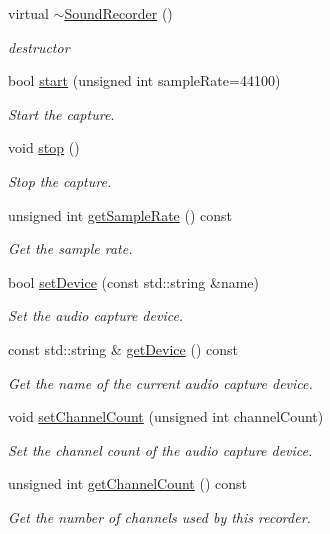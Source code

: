 \begin{DoxyCompactItemize}
\item 
\mbox{\label{classsf_1_1_sound_recorder_acc599e61aaa47edaae88cf43f0a43549}} 
virtual \hyperlink{classsf_1_1_sound_recorder_acc599e61aaa47edaae88cf43f0a43549}{$\sim$\+Sound\+Recorder} ()
\begin{DoxyCompactList}\small\item\em destructor \end{DoxyCompactList}\item 
bool \hyperlink{classsf_1_1_sound_recorder_a715f0fd2f228c83d79aaedca562ae51f}{start} (unsigned int sample\+Rate=44100)
\begin{DoxyCompactList}\small\item\em Start the capture. \end{DoxyCompactList}\item 
void \hyperlink{classsf_1_1_sound_recorder_a8d9c8346aa9aa409cfed4a1101159c4c}{stop} ()
\begin{DoxyCompactList}\small\item\em Stop the capture. \end{DoxyCompactList}\item 
unsigned int \hyperlink{classsf_1_1_sound_recorder_aed292c297a3e0d627db4eb5c18f58c44}{get\+Sample\+Rate} () const
\begin{DoxyCompactList}\small\item\em Get the sample rate. \end{DoxyCompactList}\item 
bool \hyperlink{classsf_1_1_sound_recorder_a8eb3e473292c16e874322815836d3cd3}{set\+Device} (const std\+::string \&name)
\begin{DoxyCompactList}\small\item\em Set the audio capture device. \end{DoxyCompactList}\item 
const std\+::string \& \hyperlink{classsf_1_1_sound_recorder_ab16cd53c6884cbf3380c017cee72ba81}{get\+Device} () const
\begin{DoxyCompactList}\small\item\em Get the name of the current audio capture device. \end{DoxyCompactList}\item 
void \hyperlink{classsf_1_1_sound_recorder_ae4e22ba67d12a74966eb05fad55a317c}{set\+Channel\+Count} (unsigned int channel\+Count)
\begin{DoxyCompactList}\small\item\em Set the channel count of the audio capture device. \end{DoxyCompactList}\item 
unsigned int \hyperlink{classsf_1_1_sound_recorder_a610e98e7a73b316ce26b7c55234f86e9}{get\+Channel\+Count} () const
\begin{DoxyCompactList}\small\item\em Get the number of channels used by this recorder. \end{DoxyCompactList}\end{DoxyCompactItemize}
